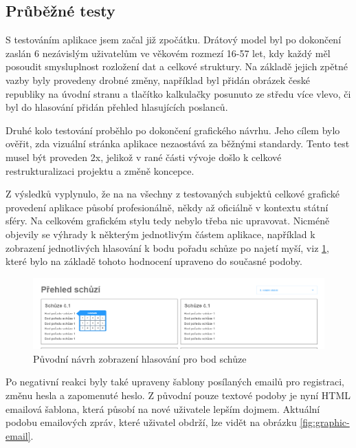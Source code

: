 \subsection{Průběžné testy}
S testováním aplikace jsem začal již zpočátku. Drátový model byl po dokončení zaslán 6 nezávislým uživatelům ve věkovém rozmezí 16-57 let, kdy každý měl posoudit smysluplnost rozložení dat a celkové struktury. Na základě jejich zpětné vazby byly provedeny drobné změny, například byl přidán obrázek české republiky na úvodní stranu a tlačítko kalkulačky posunuto ze středu více vlevo, či byl do hlasování přidán přehled hlasujících poslanců.

\par Druhé kolo testování proběhlo po dokončení grafického návrhu. Jeho cílem bylo ověřit, zda vizuální stránka aplikace nezaostává za běžnými standardy. Tento test musel být proveden 2x, jelikož v rané části vývoje došlo k celkové restrukturalizaci projektu a změně koncepce.
\par Z výsledků vyplynulo, že na na všechny z testovaných subjektů celkové grafické provedení aplikace působí profesionálně, někdy až oficiálně v kontextu státní sféry. Na celkovém grafickém stylu tedy nebylo třeba nic upravovat. Nicméně objevily se výhrady k některým jednotlivým částem aplikace, například k zobrazení jednotlivých hlasování k bodu pořadu schůze po najetí myší, viz \ref{fig:wireframe-schuze-hover}, které bylo na základě tohoto hodnocení upraveno do současné podoby.

\begin{figure}
    \centering
    \includegraphics[width=1\textwidth]{obrazky-figures/wireframe-schuze-hover.png}
    \caption{Původní návrh zobrazení hlasování pro bod schůze}
    \label{fig:wireframe-schuze-hover}
\end{figure}


\par Po negativní reakci byly také upraveny šablony posílaných emailů pro registraci, změnu hesla a zapomenuté heslo. Z původní pouze textové podoby je nyní HTML emailová šablona, která působí na nové uživatele lepším dojmem. Aktuální podobu emailových zpráv, které uživatel obdrží, lze vidět na obrázku \ref{fig:graphic-email}.

